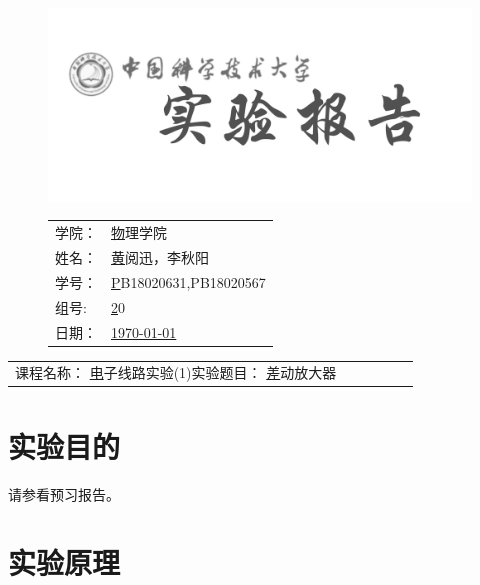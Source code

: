 \documentclass[a4paper,11pt,UTF8]{ctexart}
\newcommand{\major}{物理学院}
\newcommand{\name}{黄阅迅，李秋阳}
\newcommand{\stuid}{PB18020631,PB18020567}
\newcommand{\group}{20}
\newcommand{\newdate}{\today}
\newcommand{\course}{电子线路实验(1)}
\newcommand{\newtitle}{差动放大器}
\begin{document}
\thispagestyle{empty}
\begin{figure}[h]
  \begin{minipage}{0.6\linewidth}
    \centerline{\includegraphics[width=\linewidth]{logo.png}}
  \end{minipage}
  \hfill
  \begin{minipage}{.4\linewidth}
    \raggedleft
    \begin{tabular*}{.8\linewidth}{ll}
      学院： & \underline\major   \\
      姓名： & \underline\name    \\
      学号： & \underline\stuid   \\
      组号:  & \underline\group   \\
      日期： & \underline\newdate \\
    \end{tabular*}
  \end{minipage}
\end{figure}

\begin{table}[!htbp]
  \centering
  \begin{tabular*}{\linewidth}{llllll}
    课程名称：  \underline\course   \qquad\qquad 实验题目：  \underline\newtitle  
  \end{tabular*}
\end{table}


\section{实验目的}

请参看预习报告。

\section{实验原理}
\end{document}
